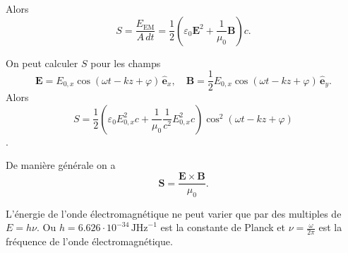 \begin{itemize}
$$$$
Alors
$$
S=\frac{E_{\mathrm{EM}}}{A\,dt}=\frac{1}{2}\left( \varepsilon_{0}\boldsymbol{E}^{2}+\frac{1}{\mu_{0}}\boldsymbol{B} \right)c.
$$
\begin{example}
On peut calculer $S$ pour les champs
$$
\boldsymbol{E}=E_{0,x}\cos(\omega t-kz+\varphi)\,\boldsymbol{\hat{e}}_{x},\quad \boldsymbol{B}=\frac{1}{2}E_{0,x}\cos(\omega t-kz+\varphi)\,\boldsymbol{\hat{e}}_{y}.
$$
Alors 
$$
S=\frac{1}{2}\left( \varepsilon_{0}E_{0,x}^{2}c+\frac{1}{\mu_{0}} \frac{1}{c^{2}}E_{0,x}^{2}c \right)\cos ^{2}(\omega t-kz+\varphi)
$$.
\end{example}
\begin{theorem}
De manière générale on a
$$
\boldsymbol{S}= \frac{\boldsymbol{E}\times \boldsymbol{B}}{\mu_{0}}.
$$
\end{theorem}
\end{itemize}

\begin{remark}
L'énergie de l'onde électromagnétique ne peut varier que par des multiples de $E=h\nu$. Ou $h=6.626\cdot 10^{-34}\,\mathrm{JHz}^{-1}$ est la constante de Planck et $\nu=\frac{\omega}{2\pi}$ est la fréquence de l'onde électromagnétique. 
\end{remark}